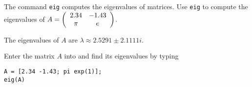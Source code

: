\documentclass{ximera}
\begin{document}
\begin{computerExercise} \label{c7.8.7}
The \Matlab command {\tt eig} computes the eigenvalues
of matrices.  Use {\tt eig} to compute the eigenvalues of 
$A = \left(\begin{array}{cc} 2.34 & -1.43\\ \pi &e\end{array}\right)$.

\begin{solution}
\ans The eigenvalues of $A$ are $\lambda \approx 2.5291 \pm
2.1111i$.

\soln Enter the matrix $A$ into \Matlab and find its eigenvalues by typing
\begin{verbatim}
A = [2.34 -1.43; pi exp(1)];
eig(A)
\end{verbatim}











\end{solution}
\end{computerExercise}
\end{document}
